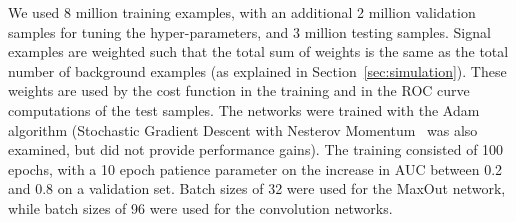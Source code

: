 We used 8 million training examples, with an additional 2 million validation samples for tuning the hyper-parameters, and 3 million testing samples.  Signal examples are weighted such that the total sum of weights is the same as the total number of background examples (as explained in Section~\ref{sec:simulation}).  These weights are used by the cost function in the training and in the ROC curve computations of the test samples.  The networks were trained with the Adam~\cite{DBLP:journals/corr/KingmaB14} algorithm (Stochastic Gradient Descent with Nesterov Momentum~\cite{Nesterov:1983wy} was also examined, but did not provide performance gains).  The training consisted of 100 epochs, with a 10 epoch patience parameter on the increase in AUC between 0.2 and 0.8 on a validation set.  Batch sizes of 32 were used for the MaxOut network, while batch sizes of 96 were used for the convolution networks.


